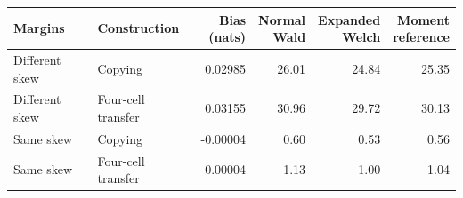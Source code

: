 \begin{tabular}{@{}llrrrr@{}}
\toprule
Margins & Construction & \shortstack{Bias\\(nats)} & \shortstack{Normal\\Wald} & \shortstack{Expanded\\Welch} & \shortstack{Moment\\reference}\\
\midrule
Different skew & Copying & 0.02985 & 26.01 & 24.84 & 25.35\\
Different skew & Four-cell transfer & 0.03155 & 30.96 & 29.72 & 30.13\\
Same skew & Copying & -0.00004 & 0.60 & 0.53 & 0.56\\
Same skew & Four-cell transfer & 0.00004 & 1.13 & 1.00 & 1.04\\
\bottomrule
\end{tabular}
